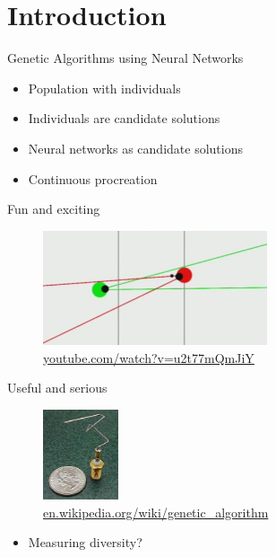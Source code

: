 
\section{Introduction}

\begin{frame}{Genetic Algorithms using Neural Networks}

  \begin{itemize}
    \item Population with individuals
    \item Individuals are candidate solutions
    \item Neural networks as candidate solutions
    \item Continuous procreation
  \end{itemize}
\end{frame}

\begin{frame}{Fun and exciting}
  \begin{figure}
    \centering
    \includegraphics[width=250px]{elias/images/sniper.png}
    \caption{\url{youtube.com/watch?v=u2t77mQmJiY}}
  \end{figure}
\end{frame}


\begin{frame}{Useful and serious}
  \begin{figure}
    \centering
    \includegraphics[height=100px]{elias/images/antenna.jpg}
    \caption{\url{en.wikipedia.org/wiki/genetic_algorithm}}
  \end{figure}
  \begin{itemize}
    \item Measuring diversity?
  \end{itemize}
\end{frame}

